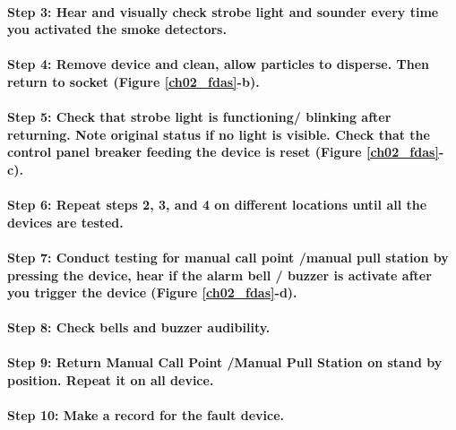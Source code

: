\paragraph{Step 3: Hear and visually check strobe light and sounder every time you activated the smoke detectors.}

\paragraph{Step 4: Remove device and clean, allow particles to disperse. Then return to socket (Figure \ref{ch02_fdas}-b).}

\paragraph{Step 5: Check that strobe light is functioning/ blinking after returning. Note original status if no light is visible. Check that the control panel breaker feeding the device is reset (Figure \ref{ch02_fdas}-c).}

\paragraph{Step 6: Repeat steps 2, 3, and 4 on different locations until all the devices are tested.}

\paragraph{Step 7: Conduct testing for manual call point /manual pull station by pressing the device, hear if the alarm bell / buzzer is activate after you trigger the device (Figure \ref{ch02_fdas}-d).}

\paragraph{Step 8: Check bells and buzzer audibility.}

\paragraph{Step 9: Return Manual Call Point /Manual Pull Station on stand by position. Repeat it on all device.}

\paragraph{Step 10: Make a record for the fault device.}


